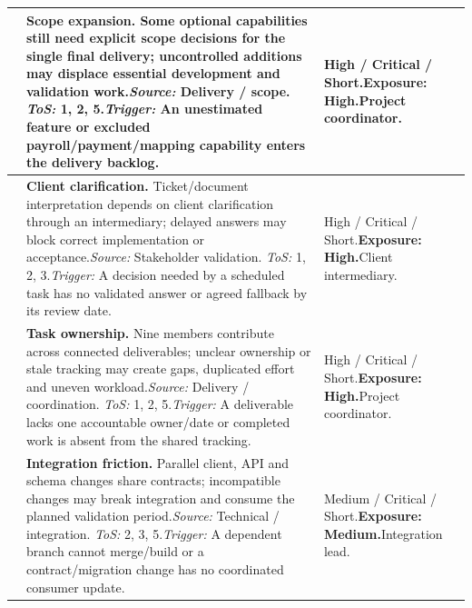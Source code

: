 {\begin{longtable}{L{0.11}L{0.62}L{0.27}}
\midrule
{}\label{risk:RS-07} & \textbf{Scope expansion.} Some optional capabilities still need explicit scope decisions for the single final delivery; uncontrolled additions may displace essential development and validation work.\newline\textit{Source:} Delivery / scope. \textit{ToS:} 1, 2, 5.\newline\textit{Trigger:} An unestimated feature or excluded payroll/payment/mapping capability enters the delivery backlog. & High / Critical / Short.\newline\textbf{Exposure: High.}\newline Project coordinator.\\
\midrule
{}\label{risk:RS-08} & \textbf{Client clarification.} Ticket/document interpretation depends on client clarification through an intermediary; delayed answers may block correct implementation or acceptance.\newline\textit{Source:} Stakeholder validation. \textit{ToS:} 1, 2, 3.\newline\textit{Trigger:} A decision needed by a scheduled task has no validated answer or agreed fallback by its review date. & High / Critical / Short.\newline\textbf{Exposure: High.}\newline Client intermediary.\\
\midrule
{}\label{risk:RS-09} & \textbf{Task ownership.} Nine members contribute across connected deliverables; unclear ownership or stale tracking may create gaps, duplicated effort and uneven workload.\newline\textit{Source:} Delivery / coordination. \textit{ToS:} 1, 2, 5.\newline\textit{Trigger:} A deliverable lacks one accountable owner/date or completed work is absent from the shared tracking. & High / Critical / Short.\newline\textbf{Exposure: High.}\newline Project coordinator.\\
\midrule
{}\label{risk:RS-10} & \textbf{Integration friction.} Parallel client, API and schema changes share contracts; incompatible changes may break integration and consume the planned validation period.\newline\textit{Source:} Technical / integration. \textit{ToS:} 2, 3, 5.\newline\textit{Trigger:} A dependent branch cannot merge/build or a contract/migration change has no coordinated consumer update. & Medium / Critical / Short.\newline\textbf{Exposure: Medium.}\newline Integration lead.\\

\end{longtable}}

